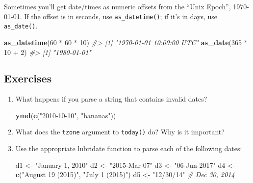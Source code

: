 \documentclass[]{book}
\newenvironment{Shaded}{\begin{snugshade}}{\end{snugshade}}
\newcommand{\KeywordTok}[1]{\textcolor[rgb]{0.13,0.29,0.53}{\textbf{{#1}}}}
\newcommand{\DecValTok}[1]{\textcolor[rgb]{0.00,0.00,0.81}{{#1}}}
\newcommand{\StringTok}[1]{\textcolor[rgb]{0.31,0.60,0.02}{{#1}}}
\newcommand{\CommentTok}[1]{\textcolor[rgb]{0.56,0.35,0.01}{\textit{{#1}}}}
\newcommand{\NormalTok}[1]{{#1}}
\begin{document}
Sometimes you'll get date/times as numeric offsets from the ``Unix
Epoch'', 1970-01-01. If the offset is in seconds, use
\texttt{as\_datetime()}; if it's in days, use \texttt{as\_date()}.

\begin{Shaded}
\begin{Highlighting}[]
\KeywordTok{as_datetime}\NormalTok{(}\DecValTok{60} \NormalTok{*}\StringTok{ }\DecValTok{60} \NormalTok{*}\StringTok{ }\DecValTok{10}\NormalTok{)}
\CommentTok{#> [1] "1970-01-01 10:00:00 UTC"}
\KeywordTok{as_date}\NormalTok{(}\DecValTok{365} \NormalTok{*}\StringTok{ }\DecValTok{10} \NormalTok{+}\StringTok{ }\DecValTok{2}\NormalTok{)}
\CommentTok{#> [1] "1980-01-01"}
\end{Highlighting}
\end{Shaded}

\subsection{Exercises}\label{exercises-45}

\begin{enumerate}
\def\labelenumi{\arabic{enumi}.}
\item
  What happens if you parse a string that contains invalid dates?

\begin{Shaded}
\begin{Highlighting}[]
\KeywordTok{ymd}\NormalTok{(}\KeywordTok{c}\NormalTok{(}\StringTok{"2010-10-10"}\NormalTok{, }\StringTok{"bananas"}\NormalTok{))}
\end{Highlighting}
\end{Shaded}
\item
  What does the \texttt{tzone} argument to \texttt{today()} do? Why is
  it important?
\item
  Use the appropriate lubridate function to parse each of the following
  dates:

\begin{Shaded}
\begin{Highlighting}[]
\NormalTok{d1 <-}\StringTok{ "January 1, 2010"}
\NormalTok{d2 <-}\StringTok{ "2015-Mar-07"}
\NormalTok{d3 <-}\StringTok{ "06-Jun-2017"}
\NormalTok{d4 <-}\StringTok{ }\KeywordTok{c}\NormalTok{(}\StringTok{"August 19 (2015)"}\NormalTok{, }\StringTok{"July 1 (2015)"}\NormalTok{)}
\NormalTok{d5 <-}\StringTok{ "12/30/14"} \CommentTok{# Dec 30, 2014}
\end{Highlighting}
\end{Shaded}
\end{enumerate}
\end{document}

